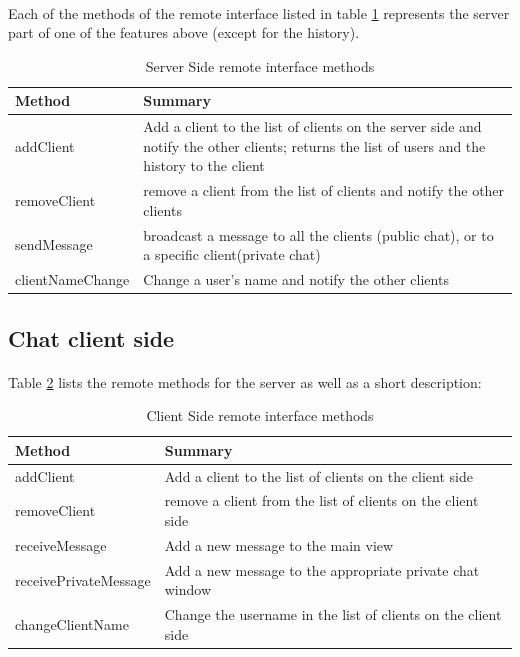 \documentclass[times, 8pt,twocolumn]{article}
\begin{document}
\paragraph{} Each of the methods of the remote interface listed in  table \ref{tab:serverprovide} represents the server part of one of the features above (except for the history).
\begin{small}
  \begin{table}[H]
  \begin{center}
      \begin{tabular}{ | l | p{5cm} |}
      \hline
      Method & Summary \\ \hline
      addClient & Add a client to the list of clients on the server side and notify the other clients; returns the list of users and the history to the client\\ \hline 
      removeClient & remove a client from the list of clients and notify the other clients\\ \hline
      sendMessage &  broadcast a message to all the clients (public chat), or to a specific client(private chat)\\ \hline
      clientNameChange & Change a user's name and notify the other clients \\ \hline
      \end{tabular}
  \end{center}
  \caption{Server Side remote interface methods}
  \label{tab:serverprovide}
  \end{table}
\end{small}
\subsection{Chat client side}
\paragraph{}Table \ref{tab:clientprovide} lists the remote methods for the server as well as a short description:
\begin{small}
  \begin{table}[H]
  \begin{center}
      \begin{tabular}{ | l | p{5cm} |}
      \hline
      Method & Summary \\ \hline
      addClient & Add a client to the list of clients on the client side \\ \hline 
      removeClient & remove a client from the list of clients on the client side \\ \hline
      receiveMessage & Add a new message to the main view \\ \hline
      receivePrivateMessage &  Add a new message to the appropriate private chat window \\ \hline
      changeClientName & Change the username in the list of clients on the client side \\ \hline
      \end{tabular}
  \end{center}
  \caption{Client Side remote interface methods}
  \label{tab:clientprovide}
  \end{table}
  \end{small}
\end{document}
